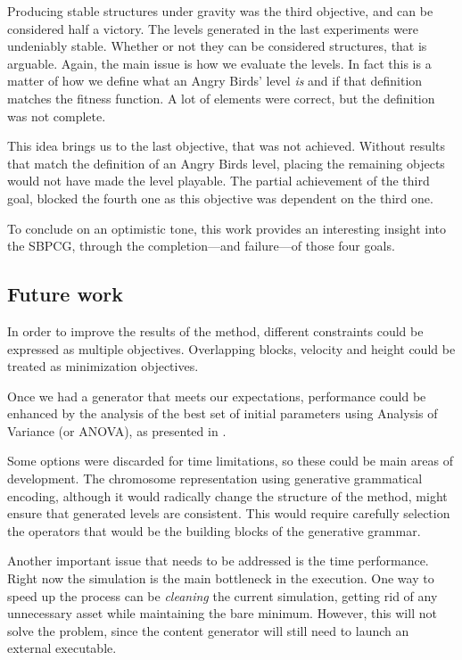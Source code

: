 Producing stable structures under gravity was the third objective, and can be considered half a victory. The levels generated in the last experiments were undeniably stable. Whether or not they can be considered structures, that is arguable. Again, the main issue is how we evaluate the levels. In fact this is a matter of how we define what an Angry Birds' level \textit{is} and if that definition matches the fitness function. A lot of elements were correct, but the definition was not complete.

This idea brings us to the last objective, that was not achieved. Without results that match the definition of an Angry Birds level, placing the remaining objects would not have made the level playable. The partial achievement of the third goal, blocked the fourth one as this objective was dependent on the third one.

To conclude on an optimistic tone, this work provides an interesting insight into the SBPCG, through the completion---and failure---of those four goals.

\subsection{Future work}

In order to improve the results of the method, different constraints could be expressed as multiple objectives. Overlapping blocks, velocity and height could be treated as minimization objectives.

Once we had a generator that meets our expectations, performance could be enhanced by the analysis of the best set of initial parameters using Analysis of Variance (or ANOVA), as presented in \cite{estevez2017statistical}. 

Some options were discarded for time limitations, so these could be main areas of development. The chromosome representation using generative grammatical encoding\cite{hornby2001advantages}, although it would radically change the structure of the method, might ensure that generated levels are consistent. This would require carefully selection the operators that would be the building blocks of the generative grammar.

Another important issue that needs to be addressed is the time performance. Right now the simulation is the main bottleneck in the execution. One way to speed up the process can be \textit{cleaning} the current simulation, getting rid of any unnecessary asset while maintaining the bare minimum. However, this will not solve the problem, since the content generator will still need to launch an external executable.

